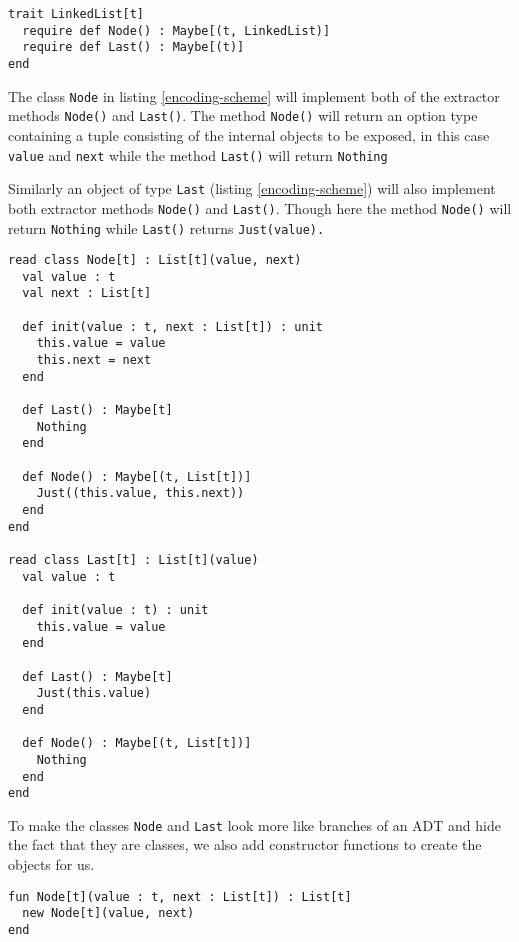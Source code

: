 \documentclass[10pt]{report}
\def\code#1{\texttt{#1}} %
\begin{document}
{\begin{lstlisting}[language=encore,caption={trait LinkedList that requires classes to implement destructor methods}]
trait LinkedList[t]
  require def Node() : Maybe[(t, LinkedList)]
  require def Last() : Maybe[(t)]
end
\end{lstlisting}
\par{The class \code{Node} in listing \ref{encoding-scheme} will implement both of the extractor methods \code{Node()} and \code{Last()}. The method \code{Node()} will return an option type containing a tuple consisting of the internal objects to be exposed, in this case \code{value} and \code{next} while the method \code{Last()} will return \code{Nothing}}

\par{Similarly an object of type \code{Last} (listing \ref{encoding-scheme}) will also implement both extractor methods \code{Node()} and \code{Last()}. Though here the method \code{Node()} will return \code{Nothing} while \code{Last()} returns \code{Just(value).}}

\begin{lstlisting}[language=encore,caption={Implementation of Node and Last classes},label=encoding-scheme]
read class Node[t] : List[t](value, next)
  val value : t
  val next : List[t]

  def init(value : t, next : List[t]) : unit
    this.value = value
    this.next = next
  end

  def Last() : Maybe[t]
    Nothing
  end

  def Node() : Maybe[(t, List[t])]
    Just((this.value, this.next))
  end
end

read class Last[t] : List[t](value)
  val value : t

  def init(value : t) : unit
    this.value = value
  end

  def Last() : Maybe[t]
    Just(this.value)
  end

  def Node() : Maybe[(t, List[t])]
    Nothing
  end
end
\end{lstlisting}

\par{To make the classes \code{Node} and \code{Last} look more like branches of an ADT and hide the fact that they are classes, we also add constructor functions to create the objects for us.}

\begin{lstlisting}[language=encore,caption={Constructor functions for Node and Last}]
fun Node[t](value : t, next : List[t]) : List[t]
  new Node[t](value, next)
end


\end{lstlisting}}
\end{document}
